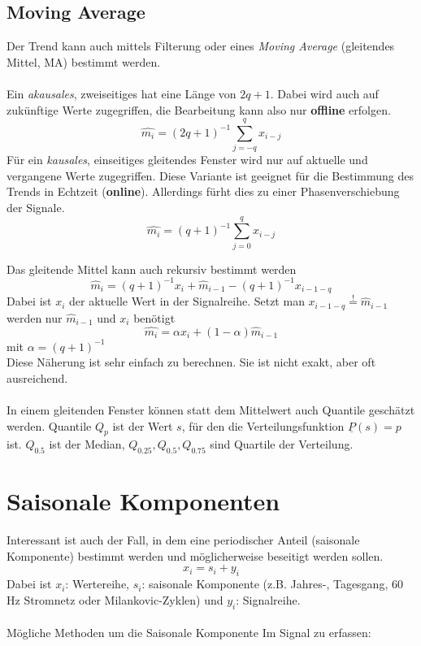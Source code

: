 \subsection{Moving Average}
Der Trend kann auch mittels Filterung oder eines \textsl{Moving Average} (gleitendes Mittel, MA) bestimmt werden.\\\\
Ein \textit{akausales}, zweiseitiges hat eine Länge von $2q + 1$. Dabei wird auch auf zukünftige Werte zugegriffen, die Bearbeitung kann also nur \textbf{offline} erfolgen.
\begin{equation}
\hat{m_i}=(2q+1)^{-1}\sum\limits_{j=-q}^q x_{i-j}
\end{equation}
Für ein \textit{kausales}, einseitiges gleitendes Fenster wird nur auf aktuelle und vergangene Werte zugegriffen. Diese Variante ist geeignet für die Bestimmung des Trends in Echtzeit (\textbf{online}). Allerdings fürht dies zu einer Phasenverschiebung der Signale.
\begin{equation}
\hat{m_i}=(q+1)^{-1}\sum\limits_{j=0}^q x_{i-j}
\end{equation}

Das gleitende Mittel kann auch rekursiv bestimmt werden
\begin{equation}
\hat m_i=(q+1)^{-1} x_i +  \hat m_{i-1}-(q+1)^{-1} x_{i-1-q}
\end{equation}
Dabei ist $x_i$ der aktuelle Wert in der Signalreihe. Setzt man $x_{i-1-q}\stackrel{!}{=}\hat m_{i-1}$ werden nur $\hat m_{i-1}$ und $x_i$ benötigt
\begin{equation}
\hat{m_i}= \alpha x_i + (1-\alpha) \hat m_{i-1}
\end{equation}
{\small mit $\alpha = (q+1)^{-1}$}\\
Diese Näherung ist sehr einfach zu berechnen. Sie ist nicht exakt, aber oft ausreichend.\\\\
In einem gleitenden Fenster können statt dem Mittelwert auch Quantile geschätzt werden. Quantile $Q_p$ ist der Wert $s$, für den die Verteilungsfunktion $\underline P(s)=p$ ist. $Q_{0.5}$ ist der Median, $Q_{0.25},Q_{0.5},Q_{0.75}$ sind Quartile der Verteilung.

\section{Saisonale Komponenten}
Interessant ist auch der Fall, in dem eine periodischer Anteil (saisonale Komponente) bestimmt werden und möglicherweise beseitigt werden sollen.
\[
x_i=s_i + y_i
\]
{\small Dabei ist $x_i$: Wertereihe, $s_i$: saisonale Komponente (z.B. Jahres-, Tagesgang, 60 Hz Stromnetz oder Milankovic-Zyklen) und $y_i$: Signalreihe.}\\\\
Mögliche Methoden um die Saisonale Komponente Im Signal zu erfassen:

